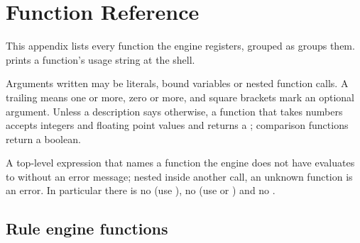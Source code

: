 \chapter{Function Reference}
\label{app:functions}

This appendix lists every function the engine registers, grouped as
 groups them.  prints a function's
usage string at the shell.

Arguments written  may be literals, bound variables or nested
function calls. A trailing \fn{+} means one or more, \fn{*} zero or more,
and square brackets mark an optional argument. Unless a description says
otherwise, a function that takes numbers accepts integers and floating
point values and returns a ; comparison functions return a
boolean.

\begin{note}
A top-level expression that names a function the engine does not have
evaluates to  without an error message; nested inside another
call, an unknown function is an error. In particular there is no 
(use ), no  (use  or ) and no
.
\end{note}

\section{Rule engine functions}


